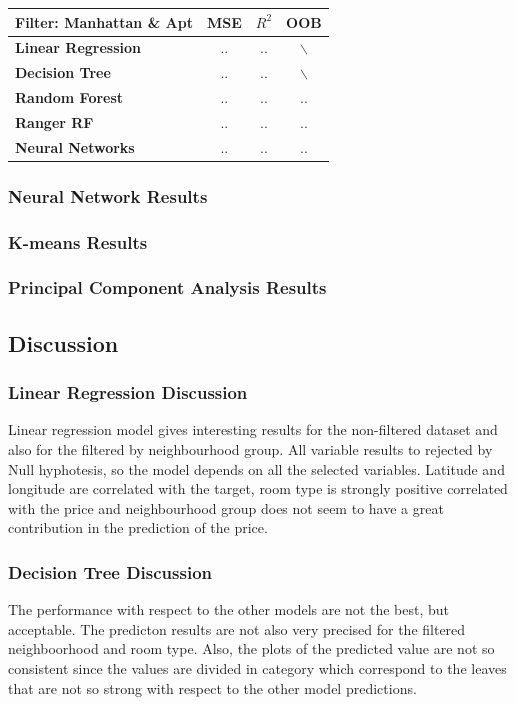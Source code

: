 \documentclass{FR16}
\begin{document}
\begin{center}
\begin{tabular}{l c c c }
\arrayrulecolor{Azzurro}
\hline
{\bfseries Filter: Manhattan \& Apt
} & MSE & $R^2$ & OOB \\
\hline
{\bfseries Linear Regression} & .. & .. & $\backslash$ \\
{\bfseries Decision Tree} & .. & .. & $\backslash$ \\
{\bfseries Random Forest} & .. & .. & .. \\
{\bfseries Ranger RF} & .. & .. & .. \\
{\bfseries Neural Networks} & .. & .. & .. \\
\hline
\end{tabular}
\end{center}

\subsubsection{Neural Network Results}

\subsubsection{K-means Results}


\subsubsection{Principal Component Analysis Results}

\newpage
\subsection{Discussion}

\subsubsection{Linear Regression Discussion}
Linear regression model gives interesting results for the non-filtered dataset and also for the filtered by neighbourhood group.
All variable results to rejected by Null hyphotesis, so the model depends on all the selected variables.
Latitude and longitude are correlated with the target, room type is strongly positive correlated with the price and neighbourhood group does not seem to have
a great contribution in the prediction of the price.
\\

\subsubsection{Decision Tree Discussion}
The performance with respect to the other models are not the best, but acceptable. The predicton results are not also very precised for the filtered neighboorhood 
and room type. Also, the plots of the predicted value are not so consistent since the values are divided in category which correspond to the leaves that are not so strong
with respect to the other model predictions.
\\
\end{document}
